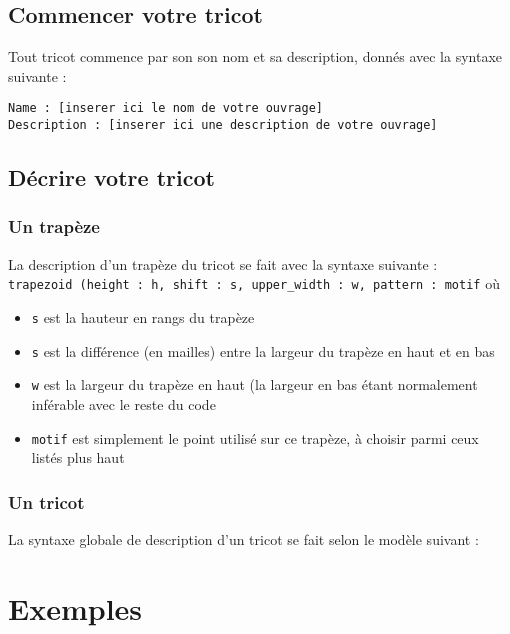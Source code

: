 \documentclass[a4paper,10pt]{article}
\begin{document}
  \subsection{Commencer votre tricot}
  
Tout tricot commence par son son nom et sa description, donnés avec la syntaxe suivante :

\noindent \texttt{Name : [inserer ici le nom de votre ouvrage] \\
  Description : [inserer ici une description de votre ouvrage]}
  
  \subsection{Décrire votre tricot}

\subsubsection{Un trapèze}

  La description d'un trapèze du tricot se fait avec la syntaxe suivante : \\
\texttt{trapezoid (height : h, shift : s, upper\_width : w, pattern : motif} où 
\begin{itemize}
\item \texttt{s} est la hauteur en rangs du trapèze
\item \texttt{s} est la différence (en mailles) entre la largeur du trapèze en haut et en bas
\item \texttt{w} est la largeur du trapèze en haut (la largeur en bas étant normalement inférable avec le reste du code
\item \texttt{motif} est simplement le point utilisé sur ce trapèze, à choisir parmi ceux listés plus haut
\end{itemize}

\subsubsection{Un tricot}

La syntaxe globale de description d'un tricot se fait selon le modèle suivant :\\
  

\appendix

\section{Exemples}
\end{document}

